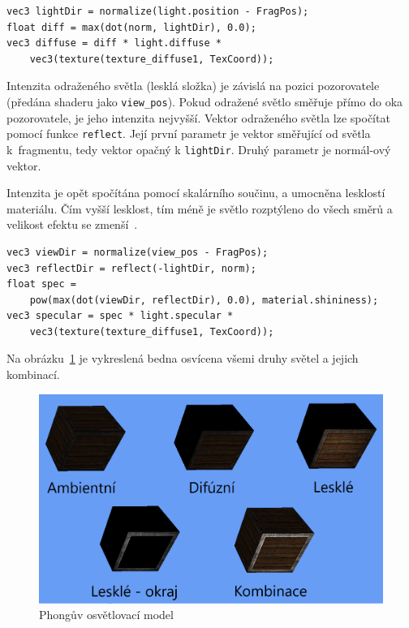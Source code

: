 \documentclass[thesis=M,czech]{FITthesis}[2019/12/23]
\begin{document}
\begin{verbatim}
vec3 lightDir = normalize(light.position - FragPos);
float diff = max(dot(norm, lightDir), 0.0);
vec3 diffuse = diff * light.diffuse * 
    vec3(texture(texture_diffuse1, TexCoord));
\end{verbatim}

Intenzita odraženého světla (lesklá složka) je závislá na pozici pozorovatele (předána shaderu jako \texttt{view\_pos}). Pokud odražené světlo směřuje přímo do oka pozorovatele, je jeho intenzita nejvyšší. Vektor odraženého světla lze spočítat pomocí funkce \texttt{reflect}. Její první parametr je vektor směřující od světla k~fragmentu, tedy vektor opačný k \texttt{lightDir}. Druhý parametr je normál-ový vektor.

Intenzita je opět spočítána pomocí skalárního součinu, a umocněna lesklostí materiálu. Čím vyšší lesklost, tím méně je světlo rozptýleno do všech směrů a velikost efektu se zmenší~\cite{lopgl_basic_light}.

\begin{verbatim}
vec3 viewDir = normalize(view_pos - FragPos);
vec3 reflectDir = reflect(-lightDir, norm);
float spec = 
    pow(max(dot(viewDir, reflectDir), 0.0), material.shininess);
vec3 specular = spec * light.specular * 
    vec3(texture(texture_diffuse1, TexCoord));
\end{verbatim}

Na obrázku~\ref{fig:phong} je vykreslená bedna osvícena všemi druhy světel a jejich kombinací.

\begin{figure}\centering
	\includegraphics[width=\textwidth]{images/phong}
	\caption[Phongův osvětlovací model]{Phongův osvětlovací model}\label{fig:phong}
\end{figure}
\end{document}
